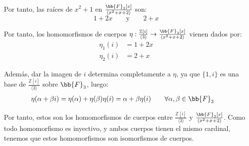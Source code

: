 \begin{ejercicio}
\begin{itemize}
\begin{itemize}
                Por tanto, las raíces de $x^2+1$ en $\frac{\bb{F}_3[x]}{\langle x^2+x+2 \rangle }$ son:
                \begin{equation*}
                    1+2x \qquad\text{y}\qquad 2+x
                \end{equation*}
            \end{itemize}        
    \end{itemize}



    Por tanto, los homomorfismos de cuerpos $\eta:\frac{\mathbb{Z}[i]}{\langle 3 \rangle }\to \frac{\bb{F}_3[x]}{\langle x^2+x+2 \rangle }$ vienen dados por:
    \begin{align*}
        \eta_1(i) &= 1+2x \\
        \eta_2(i) &= 2+x
    \end{align*}

    Además, dar la imagen de $i$ determina completamente a $\eta$, ya que $\{1,i\}$ es una base de $\frac{\mathbb{Z}[i]}{\langle 3 \rangle }$ sobre $\bb{F}_3$, luego:
    \begin{align*}
        \eta(\alpha+\beta i) &= \eta(\alpha)+\eta(\beta)\eta(i) = \alpha + \beta \eta(i)\qquad \forall \alpha,\beta\in \bb{F}_3
    \end{align*}

    Por tanto, estos son los homomorfismos de cuerpos entre $\frac{\mathbb{Z}[i]}{\langle 3 \rangle }$ y $\frac{\bb{F}_3[x]}{\langle x^2+x+2 \rangle }$. Como todo homomorfismo es inyectivo, y ambos cuerpos tienen el mismo cardinal, tenemos que estos homomorfismos son isomorfismos de cuerpos.
\end{ejercicio}

